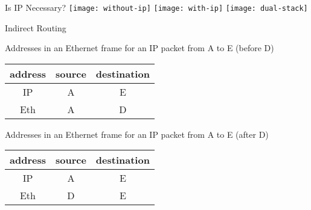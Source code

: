 \begin{frame}{Is IP Necessary?}
  \centering
  \texttt{[image: without-ip]}\quad
  \texttt{[image: with-ip]}\quad
  \texttt{[image: dual-stack]}
\end{frame}

\begin{frame}{Indirect Routing}
  \begin{center}
  \end{center}
  \label{fig:indirect-routing}
\end{frame}

\begin{frame}
  \begin{iblock}{Addresses in an Ethernet frame for an IP packet from A to E (before D)}
    \begin{center}
      \begin{tabular}{ccc}
        \toprule
        address & source & destination\\\midrule
        IP & A & E \\
        Eth & A & D \\\bottomrule
      \end{tabular}
    \end{center}
  \end{iblock}
  \begin{iblock}{Addresses in an Ethernet frame for an IP packet from A to E (after D)}
    \begin{center}
      \begin{tabular}{ccc}
        \toprule
        address & source & destination\\\midrule
        IP & A & E \\
        Eth & D & E \\\bottomrule
      \end{tabular}
    \end{center}
  \end{iblock}
\end{frame}


